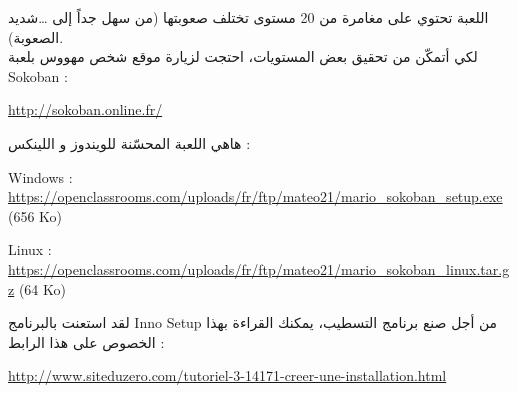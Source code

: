 اللعبة تحتوي على مغامرة من 20 مستوى تختلف صعوبتها (من سهل جداً إلى \dots شديد الصعوبة). \\
لكي أتمكّن من تحقيق بعض المستويات، احتجت لزيارة موقع شخص مهووس بلعبة
\textenglish{Sokoban} :

\url{http://sokoban.online.fr/}

هاهي اللعبة المحسّنة للويندوز و اللينكس :

\textenglish{Windows : \url{https://openclassrooms.com/uploads/fr/ftp/mateo21/mario_sokoban_setup.exe} (656 Ko)}

\textenglish{Linux : \url{https://openclassrooms.com/uploads/fr/ftp/mateo21/mario_sokoban_linux.tar.gz} (64 Ko)}

لقد استعنت بالبرنامج
\textenglish{Inno Setup}
من أجل صنع برنامج التسطيب، يمكنك القراءة بهذا الخصوص على هذا الرابط :

\url{http://www.siteduzero.com/tutoriel-3-14171-creer-une-installation.html}
